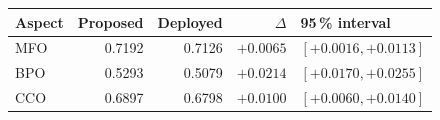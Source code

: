 \begin{tabular}{lrrrl}
\toprule
    \textbf{Aspect} & \textbf{Proposed} & \textbf{Deployed} & \textbf{$\Delta$} & \textbf{95\,\% interval} \\
\midrule
    MFO & 0.7192 & 0.7126 & $\mathbf{+0.0065}$ & $[+0.0016, +0.0113]$ \\
    BPO & 0.5293 & 0.5079 & $\mathbf{+0.0214}$ & $[+0.0170, +0.0255]$ \\
    CCO & 0.6897 & 0.6798 & $\mathbf{+0.0100}$ & $[+0.0060, +0.0140]$ \\
\bottomrule
\end{tabular}
